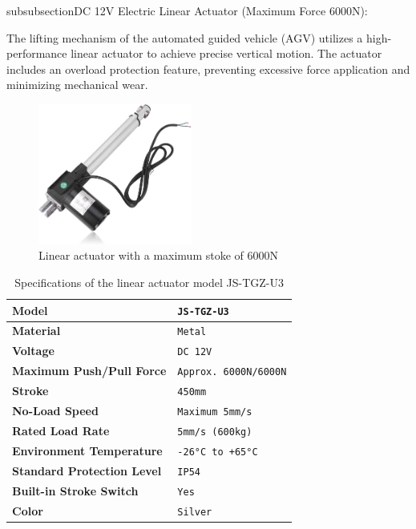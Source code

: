 \documentclass[../../main]{subfiles}
\begin{document}
\begin{itemize}
\newpage
subsubsection{DC 12V Electric Linear Actuator (Maximum Force 6000N):}

The lifting mechanism of the automated guided vehicle (AGV)  
utilizes a high-performance linear actuator to achieve  
precise vertical motion. The actuator includes an overload  
protection feature, preventing excessive force application  
and minimizing mechanical wear.

\begin{figure}[h!]
    \centering
    \includegraphics[width=0.45\textwidth]{fig/linear_actuator.jpg}
    \caption{Linear actuator with a maximum stoke of 6000N }
    \label{Linear actuator} %
\end{figure}

\begin{table}[h!]
    \centering
    \begin{tabular}{|>{\bfseries}l|>{\ttfamily}l|} %
    \hline
    Model & \texttt{JS-TGZ-U3} \\ \hline
    Material & \texttt{Metal} \\ \hline
    Voltage & \texttt{DC 12V} \\ \hline
    Maximum Push/Pull Force & \texttt{Approx. 6000N/6000N} \\ \hline
    Stroke & \texttt{450mm} \\ \hline
    No-Load Speed & \texttt{Maximum 5mm/s} \\ \hline
    Rated Load Rate & \texttt{5mm/s (600kg)} \\ \hline
    Environment Temperature & \texttt{-26°C to +65°C} \\ \hline
    Standard Protection Level & \texttt{IP54} \\ \hline
    Built-in Stroke Switch & \texttt{Yes} \\ \hline
    Color & \texttt{Silver} \\ \hline
    \end{tabular}
    \caption{Specifications of the linear actuator model JS-TGZ-U3}
    \label{Linear Actuator Specifications} %
    
\end{table}

\end{itemize}
\end{document}

